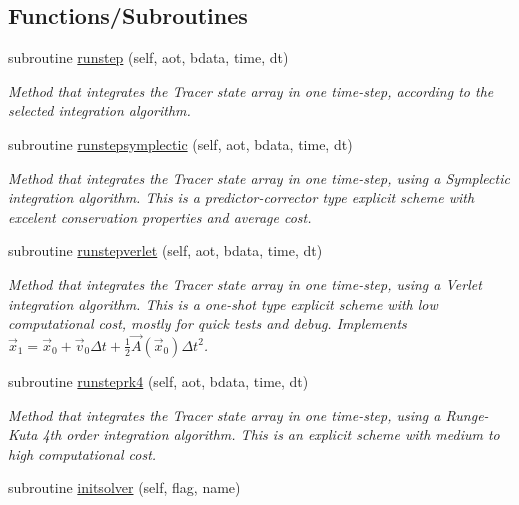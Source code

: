 \subsection*{Functions/\+Subroutines}
\begin{DoxyCompactItemize}
\item 
subroutine \mbox{\hyperlink{namespacesolver__mod_ab87d71c6c8aa1709901ec14f9bf12505}{runstep}} (self, aot, bdata, time, dt)
\begin{DoxyCompactList}\small\item\em Method that integrates the Tracer state array in one time-\/step, according to the selected integration algorithm. \end{DoxyCompactList}\item 
subroutine \mbox{\hyperlink{namespacesolver__mod_a91ddfd70d0f6d65b00fe6b08f4113cd6}{runstepsymplectic}} (self, aot, bdata, time, dt)
\begin{DoxyCompactList}\small\item\em Method that integrates the Tracer state array in one time-\/step, using a Symplectic integration algorithm. This is a predictor-\/corrector type explicit scheme with excelent conservation properties and average cost. \end{DoxyCompactList}\item 
subroutine \mbox{\hyperlink{namespacesolver__mod_acf893016edd8e0eb4bc77666aed1096f}{runstepverlet}} (self, aot, bdata, time, dt)
\begin{DoxyCompactList}\small\item\em Method that integrates the Tracer state array in one time-\/step, using a Verlet integration algorithm. This is a one-\/shot type explicit scheme with low computational cost, mostly for quick tests and debug. Implements $ {\vec {x}}_{1}={\vec {x}}_{0}+{\vec {v}}_{0}\Delta t+{\frac {1}{2}}{\vec {A}}({\vec {x}}_{0})\Delta t^{2}$. \end{DoxyCompactList}\item 
subroutine \mbox{\hyperlink{namespacesolver__mod_ae59da54f053ae369d76f130b3790f3b7}{runsteprk4}} (self, aot, bdata, time, dt)
\begin{DoxyCompactList}\small\item\em Method that integrates the Tracer state array in one time-\/step, using a Runge-\/\+Kuta 4th order integration algorithm. This is an explicit scheme with medium to high computational cost. \end{DoxyCompactList}\item 
subroutine \mbox{\hyperlink{namespacesolver__mod_a326292ff19880a914317109520b200b2}{initsolver}} (self, flag, name)

\end{DoxyCompactItemize}

